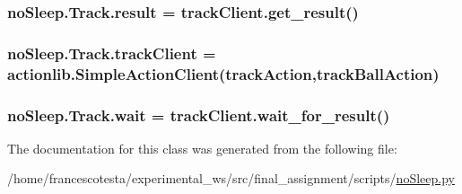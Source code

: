 \subsubsection[{\texorpdfstring{result}{result}}]{\setlength{\rightskip}{0pt plus 5cm}no\+Sleep.\+Track.\+result = track\+Client.\+get\+\_\+result()\hspace{0.3cm}{\ttfamily [static]}}\hypertarget{classnoSleep_1_1Track_ab23617bf485f7d5bc2c03e0b6b17017f}{}\label{classnoSleep_1_1Track_ab23617bf485f7d5bc2c03e0b6b17017f}
\subsubsection[{\texorpdfstring{track\+Client}{trackClient}}]{\setlength{\rightskip}{0pt plus 5cm}no\+Sleep.\+Track.\+track\+Client = actionlib.\+Simple\+Action\+Client(\textquotesingle{}track\+Action\textquotesingle{},track\+Ball\+Action)\hspace{0.3cm}{\ttfamily [static]}}\hypertarget{classnoSleep_1_1Track_aa81312a09b71e383923eea00179b2330}{}\label{classnoSleep_1_1Track_aa81312a09b71e383923eea00179b2330}
\subsubsection[{\texorpdfstring{wait}{wait}}]{\setlength{\rightskip}{0pt plus 5cm}no\+Sleep.\+Track.\+wait = track\+Client.\+wait\+\_\+for\+\_\+result()\hspace{0.3cm}{\ttfamily [static]}}\hypertarget{classnoSleep_1_1Track_ab87d8de18ccaf82e3d818c8c3241a220}{}\label{classnoSleep_1_1Track_ab87d8de18ccaf82e3d818c8c3241a220}


The documentation for this class was generated from the following file\+:\begin{DoxyCompactItemize}
\item 
/home/francescotesta/experimental\+\_\+ws/src/final\+\_\+assignment/scripts/\hyperlink{noSleep_8py}{no\+Sleep.\+py}\end{DoxyCompactItemize}
